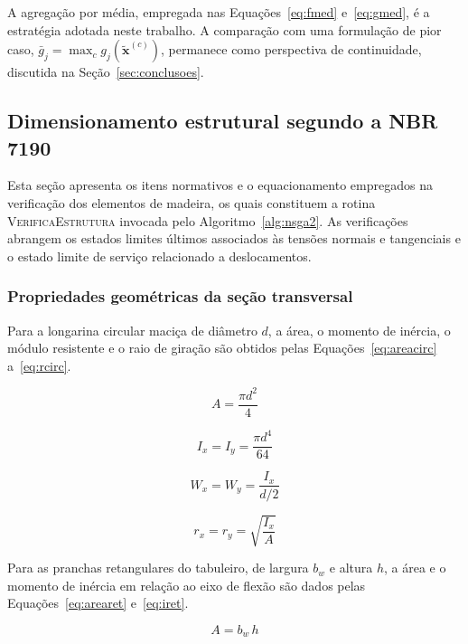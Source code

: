 A agregação por média, empregada nas Equações~\eqref{eq:fmed} e~\eqref{eq:gmed}, é a estratégia adotada neste trabalho. A comparação com uma formulação de pior caso, $\bar{g}_j = \max_c g_j(\tilde{\mathbf{x}}^{(c)})$, permanece como perspectiva de continuidade, discutida na Seção~\ref{sec:conclusoes}.

\subsection{Dimensionamento estrutural segundo a NBR 7190}\label{sec:dimensionamento}

Esta seção apresenta os itens normativos e o equacionamento empregados na verificação dos elementos de madeira, os quais constituem a rotina \textsc{VerificaEstrutura} invocada pelo Algoritmo~\ref{alg:nsga2}. As verificações abrangem os estados limites últimos associados às tensões normais e tangenciais e o estado limite de serviço relacionado a deslocamentos.

\subsubsection{Propriedades geométricas da seção transversal}

Para a longarina circular maciça de diâmetro $d$, a área, o momento de inércia, o módulo resistente e o raio de giração são obtidos pelas Equações~\eqref{eq:areacirc} a~\eqref{eq:rcirc}.

\begin{equation}
A = \frac{\pi d^2}{4}
\label{eq:areacirc}
\end{equation}

\begin{equation}
I_x = I_y = \frac{\pi d^4}{64}
\label{eq:icirc}
\end{equation}

\begin{equation}
W_x = W_y = \frac{I_x}{d/2}
\label{eq:wcirc}
\end{equation}

\begin{equation}
r_x = r_y = \sqrt{\frac{I_x}{A}}
\label{eq:rcirc}
\end{equation}

Para as pranchas retangulares do tabuleiro, de largura $b_w$ e altura $h$, a área e o momento de inércia em relação ao eixo de flexão são dados pelas Equações~\eqref{eq:arearet} e~\eqref{eq:iret}.

\begin{equation}
A = b_w\,h
\label{eq:arearet}
\end{equation}

